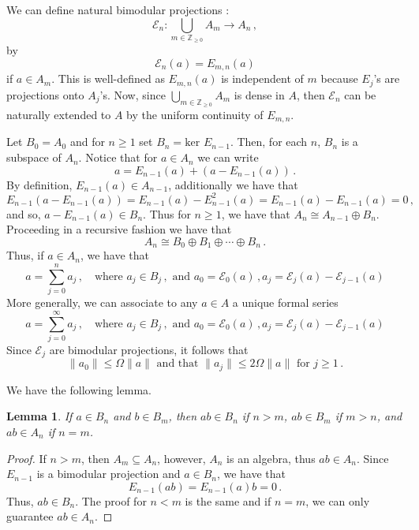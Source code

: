 \documentclass[12pt,reqno]{amsart}
\numberwithin{equation}{section}
\newcommand{\Z}{{\mathbb Z}}
\newtheorem{lem}[theo]{{\sc \bf Lemma}}
\begin{document}
We can define natural bimodular projections :
\begin{equation*}
\mathcal{E}_n:\bigcup_{m\in\Z_{\ge0}}A_m\to A_n\,,
\end{equation*}
by 
\begin{equation*}
\mathcal{E}_n(a) = E_{m,n}(a)
\end{equation*}
if $a\in A_m$. This is well-defined as $E_{m,n}(a)$ is independent of $m$ because $E_j$'s are projections onto $A_j$'s. Now, since $\bigcup_{m\in\Z_{\ge0}}A_m$ is dense in $A$, then $\mathcal{E}_n$ can be naturally extended to $A$ by the uniform continuity of $E_{m,n}$. 

Let $B_0=A_0$ and for $n\ge1$ set $B_n=\textrm{ker }E_{n-1}$. Then, for each $n$, $B_n$ is a subspace of $A_n$.  Notice that for $a\in A_n$ we can write
\begin{equation*}
a=E_{n-1}(a) + (a-E_{n-1}(a))\,.
\end{equation*}
By definition, $E_{n-1}(a)\in A_{n-1}$, additionally we have that
\begin{equation*}
E_{n-1}(a-E_{n-1}(a)) = E_{n-1}(a)-E_{n-1}^2(a) = E_{n-1}(a)-E_{n-1}(a)=0\,,
\end{equation*}
and so, $a-E_{n-1}(a)\in B_n$.  Thus for $n\ge1$, we have that $A_n\cong A_{n-1}\oplus B_n$.  Proceeding in a recursive fashion we have that
\begin{equation*}
A_n \cong B_0\oplus B_1\oplus \cdots\oplus B_n\,.
\end{equation*}
Thus, if $a\in A_n$, we have that
\begin{equation*}
a=\sum_{j=0}^na_j\,,\quad\textrm{where }a_j\in B_j\,,\textrm{ and }a_0=\mathcal{E}_0(a)\,,a_j=\mathcal{E}_j(a)-\mathcal{E}_{j-1}(a)
\end{equation*}
More generally, we can associate to any $a\in A$ a unique formal series
\begin{equation*}
a=\sum_{j=0}^\infty a_j\,,\quad\textrm{where }a_j\in B_j\,,\textrm{ and }a_0=\mathcal{E}_0(a)\,,a_j=\mathcal{E}_j(a)-\mathcal{E}_{j-1}(a)
\end{equation*}
Since $\mathcal{E}_j$ are bimodular projections, it follows that
\begin{equation*}
\|a_0\|\le \Omega\|a\| \textrm{ and that }\|a_j\|\le 2\Omega\|a\|\textrm{ for }j\ge1\,.
\end{equation*}

We have the following lemma.
\begin{lem}\label{inBnm}
If $a\in B_n$ and $b\in B_m$, then $ab\in B_n$ if $n>m$, $ab\in B_m$ if $m>n$, and $ab\in A_n$ if $n=m$.
\end{lem}
\begin{proof}
If $n>m$, then $A_m\subseteq A_n$, however, $A_n$ is an algebra, thus $ab\in A_n$.  Since $E_{n-1}$ is a bimodular projection and $a\in B_n$, we have that
\begin{equation*}
E_{n-1}(ab) = E_{n-1}(a)b = 0\,.
\end{equation*}
Thus, $ab\in B_n$.  The proof for $n<m$ is the same and if $n=m$, we can only guarantee $ab\in A_n$.
\end{proof}
\end{document}
